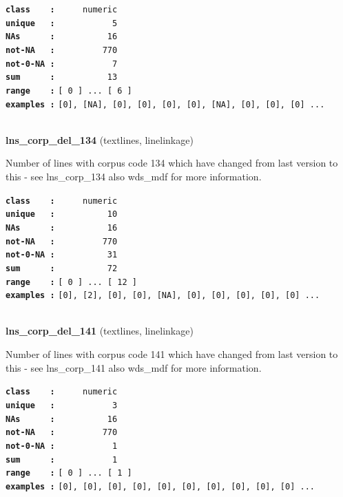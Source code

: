 \documentclass[]{article}
\begin{document}
\textbf{\texttt{class\ \ \ \ :}} \texttt{~~~~~numeric}\\
\textbf{\texttt{unique\ \ \ :}} \texttt{~~~~~~~~~~~5}\\
\textbf{\texttt{NAs\ \ \ \ \ \ :}} \texttt{~~~~~~~~~~16}\\
\textbf{\texttt{not-NA\ \ \ :}} \texttt{~~~~~~~~~770}\\
\textbf{\texttt{not-0-NA\ :}} \texttt{~~~~~~~~~~~7}\\
\textbf{\texttt{sum\ \ \ \ \ \ :}} \texttt{~~~~~~~~~~13}\\
\textbf{\texttt{range\ \ \ \ :}}
\texttt{{[}\ 0\ {]}\ ...\ {[}\ 6\ {]}}\\
\textbf{\texttt{examples\ :}}
\texttt{{[}0{]},\ {[}NA{]},\ {[}0{]},\ {[}0{]},\ {[}0{]},\ {[}0{]},\ {[}NA{]},\ {[}0{]},\ {[}0{]},\ {[}0{]}\ ...}\\

~

\textbf{lns\_corp\_del\_134} (textlines, linelinkage)

Number of lines with corpus code 134 which have changed from last
version to this - see lns\_corp\_134 also wds\_mdf for more information.

\textbf{\texttt{class\ \ \ \ :}} \texttt{~~~~~numeric}\\
\textbf{\texttt{unique\ \ \ :}} \texttt{~~~~~~~~~~10}\\
\textbf{\texttt{NAs\ \ \ \ \ \ :}} \texttt{~~~~~~~~~~16}\\
\textbf{\texttt{not-NA\ \ \ :}} \texttt{~~~~~~~~~770}\\
\textbf{\texttt{not-0-NA\ :}} \texttt{~~~~~~~~~~31}\\
\textbf{\texttt{sum\ \ \ \ \ \ :}} \texttt{~~~~~~~~~~72}\\
\textbf{\texttt{range\ \ \ \ :}}
\texttt{{[}\ 0\ {]}\ ...\ {[}\ 12\ {]}}\\
\textbf{\texttt{examples\ :}}
\texttt{{[}0{]},\ {[}2{]},\ {[}0{]},\ {[}0{]},\ {[}NA{]},\ {[}0{]},\ {[}0{]},\ {[}0{]},\ {[}0{]},\ {[}0{]}\ ...}\\

~

\textbf{lns\_corp\_del\_141} (textlines, linelinkage)

Number of lines with corpus code 141 which have changed from last
version to this - see lns\_corp\_141 also wds\_mdf for more information.

\textbf{\texttt{class\ \ \ \ :}} \texttt{~~~~~numeric}\\
\textbf{\texttt{unique\ \ \ :}} \texttt{~~~~~~~~~~~3}\\
\textbf{\texttt{NAs\ \ \ \ \ \ :}} \texttt{~~~~~~~~~~16}\\
\textbf{\texttt{not-NA\ \ \ :}} \texttt{~~~~~~~~~770}\\
\textbf{\texttt{not-0-NA\ :}} \texttt{~~~~~~~~~~~1}\\
\textbf{\texttt{sum\ \ \ \ \ \ :}} \texttt{~~~~~~~~~~~1}\\
\textbf{\texttt{range\ \ \ \ :}}
\texttt{{[}\ 0\ {]}\ ...\ {[}\ 1\ {]}}\\
\textbf{\texttt{examples\ :}}
\texttt{{[}0{]},\ {[}0{]},\ {[}0{]},\ {[}0{]},\ {[}0{]},\ {[}0{]},\ {[}0{]},\ {[}0{]},\ {[}0{]},\ {[}0{]}\ ...}\\
\end{document}

